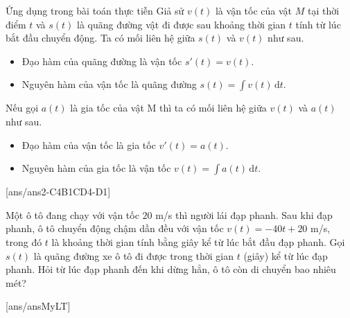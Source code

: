 \begin{dang}{Ứng dụng trong bài toán thực tiễn}
	Giả sử $v(t)$ là vận tốc của vật $ {M}$ tại thời điểm $t$ và $s(t)$ là quãng đường vật đi được sau khoảng thời gian $t$ tính từ lúc bắt đầu chuyển động. Ta có mối liên hệ giữa $s(t)$ và $v(t)$ như sau.
	\begin{itemize}
		\item  Đạo hàm của quãng đường là vận tốc $s'(t)=v(t)$.
		\item  Nguyên hàm của vận tốc là quãng đường $s(t)=\displaystyle\int v(t)  \mathrm{\,d} t$.
	\end{itemize}
	Nếu gọi $a(t)$ là gia tốc của vật M thì ta có mối liên hệ giữa $v(t)$ và $a(t)$ như sau.
	\begin{itemize}
		\item Đạo hàm của vận tốc là gia tốc $v'(t)=a(t)$.
		\item Nguyên hàm của gia tốc là vận tốc $v(t)=\displaystyle\int\limits a(t)  \mathrm{\,d} t$.
	\end{itemize}
\end{dang}
{}[ans/ans2-C4B1CD4-D1]
\begin{ex}%
	Một ô tô đang chạy với vận tốc $20$ m/s thì người lái đạp phanh. Sau khi đạp phanh, ô tô chuyển động chậm dần đều với vận tốc $v(t)=-40t+20$ m/s, trong đó $t$ là khoảng thời gian tính bằng giây kể từ lúc bắt đầu đạp phanh. Gọi  $s(t)$ là quãng đường xe ô tô đi được trong thời gian $t$  (giây) kể từ lúc đạp phanh. Hỏi từ lúc đạp phanh đến khi dừng hẳn, ô tô còn di chuyển bao nhiêu mét?
\end{ex}
[ans/ansMyLT]
